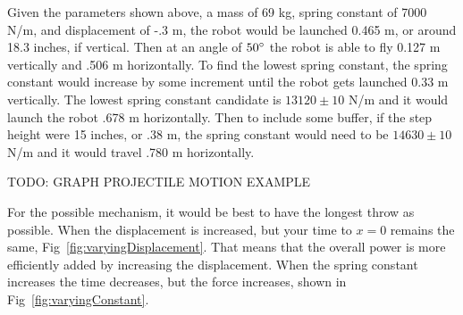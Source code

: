 \documentclass[12pt, letterpaper]{article}
\begin{document}
Given the parameters shown above, a mass of  69 kg, spring constant of 7000 N/m, and 
displacement of -.3 m, the robot would be launched 0.465 m, or around 18.3 inches, if vertical. Then at an
angle of $50\degree$ the robot is able to fly 0.127 m vertically and .506 m horizontally. To find the lowest
spring constant, the spring constant would increase by some increment until the robot gets launched 0.33 m
vertically. The lowest spring constant candidate is $13120 \pm 10$ N/m and it would launch the robot .678 m
horizontally. Then to include some buffer, if the step height were 15 inches, or .38 m, the spring constant 
would need to be $14630 \pm 10$ N/m and it would travel .780 m horizontally.

TODO: GRAPH PROJECTILE MOTION EXAMPLE

For the possible mechanism, it would be best to have the longest throw as possible. When the displacement is
increased, but your time to $x=0$ remains the same, Fig~\ref{fig:varyingDisplacement}. That means that the
overall power is more efficiently added by increasing the displacement. When the spring constant increases
the time decreases, but the force increases, shown in Fig~\ref{fig:varyingConstant}.
\end{document}
